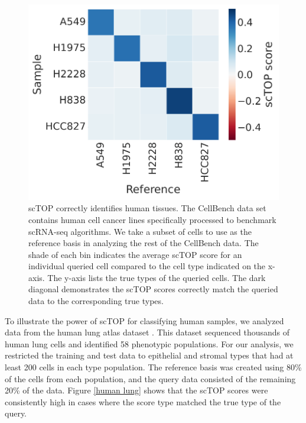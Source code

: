 \documentclass[aps,superscriptaddress, notitlepage,longbibliography]{revtex4-1}
\begin{document}
\begin{figure}
	\centering
		\includegraphics[scale=0.5]{figs/cellbench heatmap.pdf} 
	\caption{scTOP correctly identifies human tissues. The CellBench data set contains human cell cancer lines specifically processed to benchmark scRNA-seq algorithms. We take a subset of cells to use as the reference basis in analyzing the rest of the CellBench data. The shade of each bin indicates the average scTOP score for an individual queried cell compared to the cell type indicated on the x-axis. The y-axis lists the true types of the queried cells. The dark diagonal demonstrates the scTOP scores correctly match the queried data to the corresponding true types.}
	\label{cellbench}
\end{figure}

To illustrate the power of scTOP for classifying human samples, we analyzed data from the human lung atlas dataset \cite{travaglini_molecular_2020}. This dataset sequenced thousands of human lung cells and identified 58 phenotypic populations. For our analysis, we restricted the training and test data to epithelial and stromal types that had at least 200 cells in each type population. The reference basis was created using 80\% of the cells from each population, and the query data consisted of the remaining 20\% of the data. Figure \ref{human lung} shows that the scTOP scores were consistently high in cases where the score type matched the true type of the query.
\end{document}

